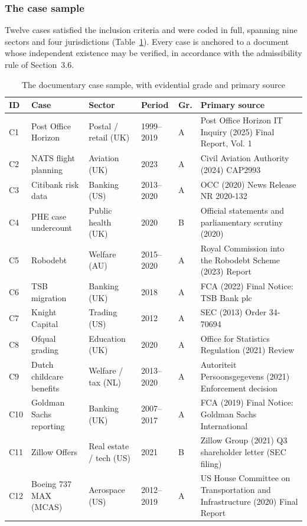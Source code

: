 \documentclass[11pt,a4paper]{article}
\numberwithin{figure}{section}
\numberwithin{table}{section}
\begin{document}
\subsubsection{The case sample}

Twelve cases satisfied the inclusion criteria and were coded in full, spanning nine sectors and four
jurisdictions (Table~\ref{tab:cases}). Every case is anchored to a document whose independent existence may
be verified, in accordance with the admissibility rule of Section~3.6.

\begin{table}[H]
\centering\footnotesize
\caption{The documentary case sample, with evidential grade and primary source}
\label{tab:cases}
\begin{tabularx}{\textwidth}{@{}p{0.7cm} p{3.0cm} p{2.6cm} p{1.5cm} p{0.7cm} X@{}}
\toprule
\textbf{ID} & \textbf{Case} & \textbf{Sector} & \textbf{Period} & \textbf{Gr.} & \textbf{Primary source} \\
\midrule
C1 & Post Office Horizon & Postal / retail (UK) & 1999–2019 & A & Post Office Horizon IT Inquiry (2025) Final Report, Vol. 1 \\
C2 & NATS flight planning & Aviation (UK) & 2023 & A & Civil Aviation Authority (2024) CAP2993 \\
C3 & Citibank risk data & Banking (US) & 2013–2020 & A & OCC (2020) News Release NR 2020-132 \\
C4 & PHE case undercount & Public health (UK) & 2020 & B & Official statements and parliamentary scrutiny (2020) \\
C5 & Robodebt & Welfare (AU) & 2015–2020 & A & Royal Commission into the Robodebt Scheme (2023) Report \\
C6 & TSB migration & Banking (UK) & 2018 & A & FCA (2022) Final Notice: TSB Bank plc \\
C7 & Knight Capital & Trading (US) & 2012 & A & SEC (2013) Order 34-70694 \\
C8 & Ofqual grading & Education (UK) & 2020 & A & Office for Statistics Regulation (2021) Review \\
C9 & Dutch childcare benefits & Welfare / tax (NL) & 2013–2020 & A & Autoriteit Persoonsgegevens (2021) Enforcement decision \\
C10 & Goldman Sachs reporting & Banking (UK) & 2007–2017 & A & FCA (2019) Final Notice: Goldman Sachs International \\
C11 & Zillow Offers & Real estate / tech (US) & 2021 & B & Zillow Group (2021) Q3 shareholder letter (SEC filing) \\
C12 & Boeing 737 MAX (MCAS) & Aerospace (US) & 2012–2019 & A & US House Committee on Transportation and Infrastructure (2020) Final Report \\
\bottomrule
\end{tabularx}
\end{table}
\end{document}
